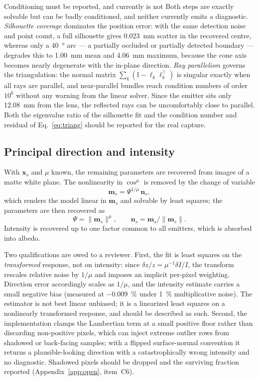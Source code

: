 \documentclass[journal,10pt]{IEEEtran}
\newcommand{\vecn}{\bm{n}}
\newcommand{\vecx}{\bm{x}}
\newcommand{\vecm}{\bm{m}}
\begin{document}
\begin{notebox}{Conditioning must be reported, and currently is not}
Both steps are exactly solvable but can be badly conditioned, and neither
currently emits a diagnostic. \emph{Silhouette coverage} dominates the position
error: with the same detection noise and point count, a full silhouette gives
\SI{0.023}{\milli\metre} scatter in the recovered centre, whereas only a
\SI{40}{\degree} arc --- a partially occluded or partially detected boundary ---
degrades this to \SI{1.00}{\milli\metre} mean and \SI{4.06}{\milli\metre}
maximum, because the cone axis becomes nearly degenerate with the in-plane
direction. \emph{Ray parallelism} governs the triangulation: the normal matrix
$\sum_k(\mathbb{I}-\bm{\ell}_k\bm{\ell}_k^{\!\top})$ is singular exactly when all
rays are parallel, and near-parallel bundles reach condition numbers of order
$10^6$ without any warning from the linear solver. Since the emitter sits only
\SI{12.08}{\milli\metre} from the lens, the reflected rays can be uncomfortably
close to parallel. Both the eigenvalue ratio of the silhouette fit and the
condition number and residual of Eq.~\eqref{eq:triang} should be reported for the
real capture.
\end{notebox}

\subsection{Principal direction and intensity}
With $\vecx_s$ and $\mu$ known, the remaining parameters are recovered from
images of a matte white plane. The nonlinearity in $\cos^\mu$ is removed by the
change of variable
\begin{equation}
\vecm_s = \Psi^{1/\mu}\,\vecn_s ,
\end{equation}
which renders the model linear in $\vecm_s$ and solvable by least squares; the
parameters are then recovered as
\begin{equation}
\Psi = \lVert\vecm_s\rVert^{\mu}, \qquad
\vecn_s = \vecm_s/\lVert\vecm_s\rVert .
\end{equation}
Intensity is recovered up to one factor common to all emitters, which is
absorbed into albedo.

Two qualifications are owed to a reviewer. First, the fit is least squares on the
\emph{transformed} response, not on intensity: since
$\delta z/z = \mu^{-1}\delta I/I$, the transform rescales relative noise by
$1/\mu$ and imposes an implicit per-pixel weighting. Direction error accordingly
scales as $1/\mu$, and the intensity estimate carries a small negative bias
(measured at \SI{-0.009}{\percent} under \SI{1}{\percent} multiplicative noise).
The estimator is not best linear unbiased; it is a linearized least squares on a
nonlinearly transformed response, and should be described as such. Second, the
implementation clamps the Lambertian term at a small positive floor rather than
discarding non-positive pixels, which can inject extreme outlier rows from
shadowed or back-facing samples; with a flipped surface-normal convention it
returns a plausible-looking direction with a catastrophically wrong intensity and
no diagnostic. Shadowed pixels should be dropped and the surviving fraction
reported (Appendix~\ref{app:open}, item~C6).
\end{document}
